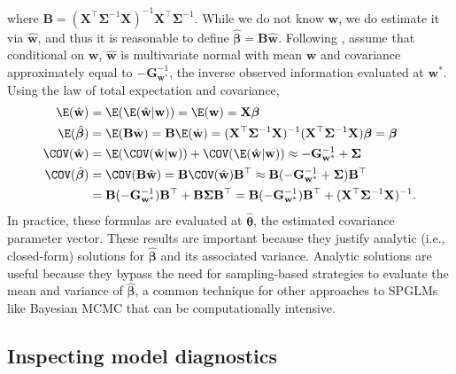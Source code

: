 \documentclass[
]{jss}
\begin{document}
where
\(\mathbf{B} = (\mathbf{X}^\top \boldsymbol{\Sigma}^{-1}\mathbf{X})^{-1}\mathbf{X}^\top \boldsymbol{\Sigma}^{-1}\).
While we do not know \(\mathbf{w}\), we do estimate it via
\(\hat{\mathbf{w}}\), and thus it is reasonable to define
\(\hat{\boldsymbol{\beta}} = \mathbf{B}\hat{\mathbf{w}}\). Following
\citet{ver2024marginal}, assume that conditional on \(\mathbf{w}\),
\(\hat{\mathbf{w}}\) is multivariate normal with mean \(\mathbf{w}\) and
covariance approximately equal to \(-\mathbf{G}_{\mathbf{w}^{*}}^{-1}\),
the inverse observed information evaluated at \(\mathbf{w}^{*}\). Using
the law of total expectation and covariance, \begin{align}
   \E(\hat{\mathbf{w}}) & =  \E( \E(\hat{\mathbf{w}} | \mathbf{w}))
   =  \E(\mathbf{w}) = \mathbf{X}\boldsymbol{\beta} \\
  \E(\hat{\boldsymbol \beta}) & = \E(\mathbf{B}\hat{\mathbf{w}}) = \mathbf{B} \E(\hat{\mathbf{w}})= (\mathbf{X}^\top \boldsymbol{\Sigma}^{-1}\mathbf{X})^{-1}(\mathbf{X}^\top \boldsymbol{\Sigma}^{-1} \mathbf{X})\boldsymbol{\beta} = \boldsymbol \beta \\
  \COV(\hat{\mathbf{w}}) & =  \E(\COV(\hat{\mathbf{w}} | \mathbf{w})) + \COV( \E(\hat{\mathbf{w}} | \mathbf{w})) \approx -\mathbf{G}_{\mathbf{w}^{*}}^{-1} + \boldsymbol{\Sigma} \\
\COV(\hat{\boldsymbol{\beta}}) & = \COV(\mathbf{B}\hat{\mathbf{w}}) = \mathbf{B}\COV(\hat{\mathbf{w}})\mathbf{B}^\top \approx \mathbf{B} (-\mathbf{G}^{-1}_{\mathbf{w}^{*}} + \boldsymbol{\Sigma}) \mathbf{B}^\top \\
& = \mathbf{B}(-\mathbf{G}^{-1}_{\mathbf{w}^{*}}) \mathbf{B}^\top + \mathbf{B}\boldsymbol{\Sigma}\mathbf{B}^\top = \mathbf{B}(-\mathbf{G}^{-1}_{\mathbf{w}^{*}})\mathbf{B}^\top
  + (\mathbf{X}^\top \boldsymbol{\Sigma}^{-1}\mathbf{X})^{-1}.
\end{align} In practice, these formulas are evaluated at
\(\hat{\boldsymbol{\theta}}\), the estimated covariance parameter
vector. These results are important because they justify analytic (i.e.,
closed-form) solutions for \(\hat{\boldsymbol{\beta}}\) and its
associated variance. Analytic solutions are useful because they bypass
the need for sampling-based strategies to evaluate the mean and variance
of \(\hat{\boldsymbol{\beta}}\), a common technique for other approaches
to SPGLMs like Bayesian MCMC that can be computationally intensive.

\subsection{Inspecting model diagnostics}\label{sec:diagnostics}
\end{document}
